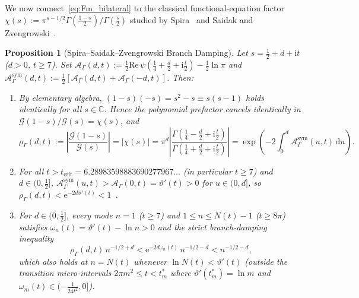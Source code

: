 \documentclass[11pt,reqno]{amsart}
\newtheorem{proposition}[theorem]{Proposition}
\theoremstyle{definition}
\theoremstyle{remark}
\numberwithin{equation}{section}
\newcommand{\C}{\mathbb{C}}
\newcommand{\dd}{\mathrm{d}}
\newcommand{\ii}{\mathrm{i}}
\newcommand{\ee}{\mathrm{e}}
\newcommand{\Rea}{\mathrm{Re}}
\begin{document}
We now connect~\eqref{eq:Fm_bilateral} to the classical functional-equation factor $\chi(s) := \pi^{s-1/2}\Gamma(\frac{1-s}{2})/\Gamma(\frac{s}{2})$ studied by Spira~\cite{spira1965} and Saidak and Zvengrowski~\cite{saidakzvengrowski2003}.

\begin{proposition}[Spira--Saidak--Zvengrowski Branch Damping]\label{prop:spira_damping}
Let $s = \frac{1}{2} + d + \ii t$ ($d > 0$, $t \ge 7$). Set $\mathcal{A}_\Gamma(d,t) := \frac{1}{2}\Rea\,\psi(\frac{1}{4} + \allowbreak\frac{d}{2} + \allowbreak\ii\frac{t}{2}) - \frac{1}{2}\ln\pi$ and $\mathcal{A}_\Gamma^{\mathrm{sym}}(d,t) := \frac{1}{2}[\mathcal{A}_\Gamma(d,t) + \allowbreak\mathcal{A}_\Gamma(-d,t)]$. Then:
\begin{enumerate}[label=\textup{(\roman*)},leftmargin=2.2em]
\item By elementary algebra, $(1-s)(-s) = s^2 - s \equiv s(s-1)$ holds identically for all $s \in \C$. Hence the polynomial prefactor cancels identically in $\mathcal{G}(1-s)/\mathcal{G}(s) = \chi(s)$, and
\begin{equation}\label{eq:rho_gamma_exact}
\rho_\Gamma(d,t) := \left\lvert\frac{\mathcal{G}(1-s)}{\mathcal{G}(s)}\right\rvert = \lvert\chi(s)\rvert = \pi^d\left\lvert\frac{\Gamma(\frac{1}{4} - \frac{d}{2} + \ii\frac{t}{2})}{\Gamma(\frac{1}{4} + \frac{d}{2} + \ii\frac{t}{2})}\right\rvert = \exp\!\left(-2\int_0^d \mathcal{A}_\Gamma^{\mathrm{sym}}(u,t)\,\dd u\right).
\end{equation}
\item For all $t > t_{\mathrm{crit}} = 6.28983598883690277967\dots$ (in particular $t \ge 7$) and $d \in (0, \frac{1}{2}]$, $\mathcal{A}_\Gamma^{\mathrm{sym}}(u,t) > \mathcal{A}_\Gamma(0,t) = \vartheta'(t) > 0$ for $u \in (0, d]$, so $\rho_\Gamma(d,t) < \ee^{-2d\vartheta'(t)} < 1$~\cite{spira1965,saidakzvengrowski2003}.
\item For $d \in (0, \frac{1}{2}]$, every mode $n = 1$ ($t \ge 7$) and $1 \le n \le N(t) - 1$ ($t \ge 8\pi$) satisfies $\omega_n(t) = \vartheta'(t) - \ln n > 0$ and the strict branch-damping inequality
\begin{equation}\label{eq:branch_damping}
\rho_\Gamma(d,t)\,n^{-1/2+d} < \ee^{-2d\omega_n(t)}\,n^{-1/2-d} < n^{-1/2-d},
\end{equation}
which also holds at $n = N(t)$ whenever $\ln N(t) < \vartheta'(t)$ (outside the transition micro-intervals $2\pi m^2 \le t < t_m^*$ where $\vartheta'(t_m^*) = \ln m$ and $\omega_m(t) \in (-\frac{1}{24t^2}, 0]$).
\end{enumerate}
\end{proposition}
\end{document}
